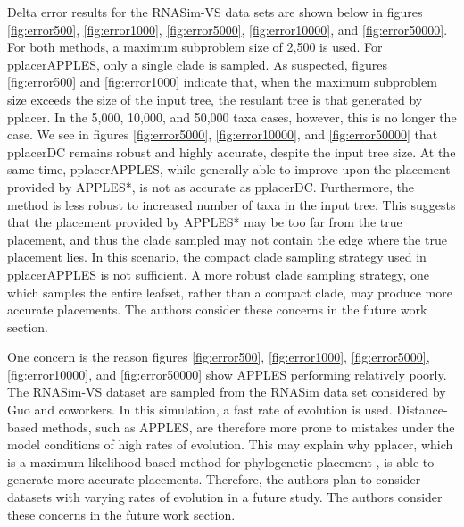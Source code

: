 \documentclass[10pt]{article}
\begin{document}
Delta error results for the RNASim-VS data sets
are shown below in figures
\ref{fig:error500},
\ref{fig:error1000},
\ref{fig:error5000},
\ref{fig:error10000},
and
\ref{fig:error50000}.
For both methods, a maximum subproblem size of 2,500 is used.
For pplacerAPPLES, only a single clade is sampled.
As suspected, figures \ref{fig:error500} and \ref{fig:error1000}
indicate that, when the maximum subproblem size exceeds
the size of the input tree, the resulant tree is that generated by pplacer.
In the 5,000, 10,000, and 50,000 taxa cases, however, this is no longer the case.
We see in figures \ref{fig:error5000}, \ref{fig:error10000}, and \ref{fig:error50000}
that pplacerDC remains robust and highly accurate, despite the input tree size.
At the same time, pplacerAPPLES, while generally able to improve upon the
placement provided by APPLES*, is not as accurate as pplacerDC.
Furthermore, the method is less robust to increased number of taxa in the input tree.
This suggests that the placement provided by APPLES* may
be too far from the true placement, and thus the clade sampled may not contain
the edge where the true placement lies.
In this scenario, the compact clade sampling strategy used in pplacerAPPLES
is not sufficient.
A more robust clade sampling strategy, one which samples the entire leafset,
rather than a compact clade, may produce more accurate placements.
The authors consider these concerns in the future work section.

One concern is the reason figures
\ref{fig:error500},
\ref{fig:error1000},
\ref{fig:error5000},
\ref{fig:error10000},
and
\ref{fig:error50000} show APPLES performing relatively poorly.
The RNASim-VS dataset are sampled from the RNASim data set considered by Guo and coworkers\cite{guo}.
In this simulation, a fast rate of evolution is used.
Distance-based methods, such as APPLES, are therefore more prone to mistakes
under the model conditions of high rates of evolution.
This may explain why pplacer, which is a maximum-likelihood based method for phylogenetic placement \cite{matsen_pplacer_2010},
is able to generate more accurate placements.
Therefore, the authors plan to consider datasets with varying rates of evolution in a future study.
The authors consider these concerns in the future work section.
\end{document}
